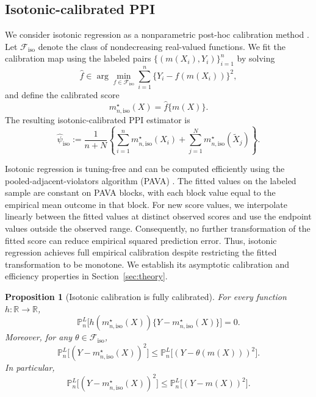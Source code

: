 \documentclass{article}
\theoremstyle{plain}
\newtheorem{proposition}{Proposition}
\theoremstyle{definition}
\newcommand{\R}{\mathbb{R}}
\newcommand{\1}{\mathbbm{1}}
\newcommand{\mhat}{m}
\newcommand{\Pl}{\mathbb{P}^{L}_n}
\begin{document}
\subsection{Isotonic-calibrated PPI}
\label{sec:iso}

We consider isotonic regression as a nonparametric post-hoc
calibration method
\citep{zadrozny2001obtaining,zadrozny2002transforming,niculescu2005predicting}.
Let $\mathcal F_{\mathrm{iso}}$ denote the class of nondecreasing
real-valued functions. We fit the calibration map using the
labeled pairs $\{(\mhat(X_i),Y_i)\}_{i=1}^n$ by solving
\[
\hat f \in \arg\min_{f \in \mathcal F_{\mathrm{iso}}}
\sum_{i=1}^n \bigl\{Y_i - f(\mhat(X_i))\bigr\}^2,
\]
and define the calibrated score
\[
m_{n,\mathrm{iso}}^\star(X) = \hat f\{\mhat(X)\}.
\]
The resulting isotonic-calibrated PPI estimator is
\[
\widehat{\psi}_{\mathrm{iso}}
:=
\frac{1}{n+N}
\left\{
\sum_{i=1}^n m_{n,\mathrm{iso}}^\star(X_i)
+
\sum_{j=1}^N m_{n,\mathrm{iso}}^\star(\widetilde X_j)
\right\}.
\]

Isotonic regression is tuning-free and can be computed
efficiently using the pooled-adjacent-violators algorithm
(PAVA) \citep{barlow1972isotonic}. The fitted values on the labeled sample are constant on PAVA blocks,
with each block value equal to the empirical mean outcome in that block.
For new score values, we interpolate linearly between the fitted values
at distinct observed scores and use the endpoint values outside the observed range. Consequently, no further transformation of
the fitted score can reduce empirical squared prediction
error. Thus, isotonic regression achieves full empirical
calibration despite restricting the fitted transformation
to be monotone. We establish its asymptotic calibration
and efficiency properties in Section~\ref{sec:theory}.

\begin{proposition}[Isotonic calibration is fully calibrated]
\label{prop:iso-repr}
For every function \(h:\R\to\R\),
\begin{equation}
\label{eq:orth}
\Pl\bigl[h(m_{n,\mathrm{iso}}^\star(X))\{Y-m_{n,\mathrm{iso}}^\star(X)\}\bigr]=0.
\end{equation}
Moreover, for any \(\theta \in \mathcal{F}_{\mathrm{iso}}\),
\[
\Pl\bigl[(Y-m_{n,\mathrm{iso}}^\star(X))^2\bigr]
\le
\Pl\bigl[(Y-\theta(\mhat(X)))^2\bigr].
\]
In particular,
\[
\Pl\bigl[(Y-m_{n,\mathrm{iso}}^\star(X))^2\bigr]
\le
\Pl\bigl[(Y-\mhat(X))^2\bigr].
\]
\end{proposition}
\end{document}
